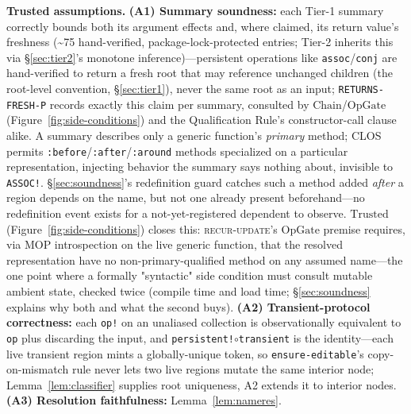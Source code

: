 \documentclass[sigplan,review,anonymous]{acmart}
\begin{document}
\textbf{Trusted assumptions.} \textbf{(A1) Summary soundness:} each Tier-1 summary correctly bounds both its argument effects and, where claimed, its return value's freshness (\textasciitilde75 hand-verified, package-lock-protected entries; Tier-2 inherits this via §\ref{sec:tier2}'s monotone inference)---persistent operations like \texttt{assoc}/\texttt{conj} are hand-verified to return a fresh root that may reference unchanged children (the root-level convention, §\ref{sec:tier1}), never the same root as an input; \texttt{RETURNS-FRESH-P} records exactly this claim per summary, consulted by $\mathrm{Chain}$/$\mathrm{OpGate}$ (Figure~\ref{fig:side-conditions}) and the Qualification Rule's constructor-call clause alike. A summary describes only a generic function's \emph{primary} method; CLOS permits \texttt{:before}/\texttt{:after}/\texttt{:around} methods specialized on a particular representation, injecting behavior the summary says nothing about, invisible to \texttt{ASSOC!}. §\ref{sec:soundness}'s redefinition guard catches such a method added \emph{after} a region depends on the name, but not one already present beforehand---no redefinition event exists for a not-yet-registered dependent to observe. $\mathrm{Trusted}$ (Figure~\ref{fig:side-conditions}) closes this: \textsc{recur-update}'s $\mathrm{OpGate}$ premise requires, via MOP introspection on the live generic function, that the resolved representation have no non-primary-qualified method on any assumed name---the one point where a formally "syntactic" side condition must consult mutable ambient state, checked twice (compile time and load time; §\ref{sec:soundness} explains why both and what the second buys). \textbf{(A2) Transient-protocol correctness:} each \texttt{op!} on an unaliased collection is observationally equivalent to \texttt{op} plus discarding the input, and \texttt{persistent!}$\circ$\texttt{transient} is the identity---each live transient region mints a globally-unique token, so \texttt{ensure-editable}'s copy-on-mismatch rule never lets two live regions mutate the same interior node; Lemma~\ref{lem:classifier} supplies root uniqueness, A2 extends it to interior nodes. \textbf{(A3) Resolution faithfulness:} Lemma~\ref{lem:nameres}.
\end{document}
